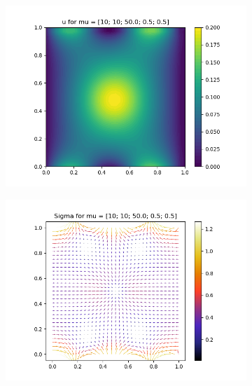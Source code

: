 \begin{figure}[!htb]
    \centering
    
    \begin{subfigure}{0.35\linewidth}
        \centering
        \includegraphics[width=\linewidth]{figs/mixed_u_mu11.png}
        \label{subfig:mu11_a}
    \end{subfigure}%
    \begin{subfigure}{0.35\linewidth}
        \centering
        \includegraphics[width=\linewidth]{figs/mixed_sig_mu11.png}
        \label{subfig:mu11_b}
    \end{subfigure}%

\end{figure}
